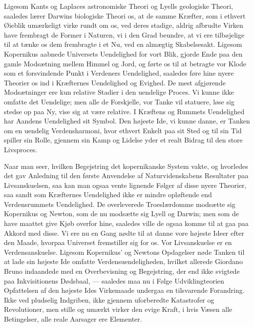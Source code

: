 \documentclass[12pt,a4paper]{article}
\begin{document}
Ligesom Kants og Laplaces astronomiske Theori og Lyells geologiske Theori,
saaledes lærer Darwins biologiske Theori os, at de samme Kræfter, som i
ethvert Øieblik umærkeligt virke rundt om os, ved deres stadige, aldrig
afbrudte Virken have frembragt de Former i Naturen, vi i den Grad
beundre, at vi ere tilbøjelige til at tænke os dem frembragte i et Nu,
ved en almægtig Skabelsesakt. Ligesom Kopernikus aabnede Universets
Uendelighed for vort Blik, gjorde Ende paa den gamle Modsætning mellem
Himmel og Jord, og førte os til at betragte vor Klode som et forsvindende
Punkt i Verdeners Uendelighed, saaledes føre hine nyere Theorier os ind i
Kræfternes Uendelighed og Evighed. De mest afgjørende Modsætninger ere
kun relative Stadier i den uendelige Proces. Vi kunne ikke omfatte det
Uendelige; men alle de Forskjelle, vor Tanke vil statuere, løse sig
stedse op paa Ny, vise sig at være relative. I Kræftens og Rummets
Uendelighed har Aandens Uendelighed sit Symbol. Den højeste Ide, vi
kunne danne, er Tanken om en uendelig Verdensharmoni, hvor ethvert Enkelt
paa sit Sted og til sin Tid spiller sin Rolle, gjennem sin Kamp og
Lidelse yder et realt Bidrag til den store Livsproces.

Naar man seer, hvilken Begejstring det kopernikanske System vakte, og
hvorledes det gav Anledning til den første Anvendelse af
Naturvidenskabens Resultater paa Livsanskuelsen, saa kan man ogsaa vente
lignende Følger af disse nyere Theorier, saa sandt som Kræfternes
Uendelighed ikke er mindre opløftende end Verdensrummets Uendelighed.
De overleverede Troeslærdomme modsætte sig Kopernikus og Newton, som de
nu modsætte sig Lyell og Darwin; men som de have maattet give Kjøb
overfor hine, saaledes ville de ogsaa komme til at gaa paa Akkord med
disse. Vi ere nu en Gang nødte til at danne vore højeste Ideer efter den
Maade, hvorpaa Universet fremstiller sig for os. Vor Livsanskuelse er en
Verdensanskuelse. Ligesom Kopernikus' og Newtons Opdagelser nøde Tanken
til at lade sin højeste Ide omfatte Verdensuendeligheden, hvilket allerede
Giordano Bruno indaandede med en Overbevisning og Begejstring, der end
ikke svigtede paa Inkvisitionens Dødsbaal, --- saaledes maa nu i Følge
Udviklingteorien Opfattelsen af den højeste Ides Virkemaade undergaa en
tilsvarende Forandring. Ikke ved pludselig Indgriben, ikke gjennem
uforberedte Katastrofer og Revolutioner, men stille og umærkt virker
den evige Kraft, i hvis Væsen alle Betingelser, alle reale Aarsager ere
Elementer.
\end{document}

